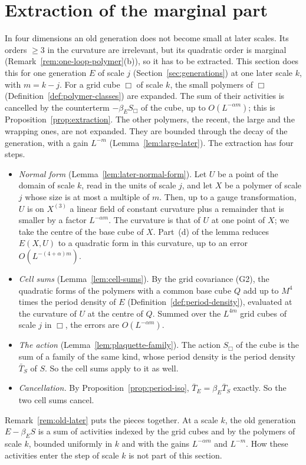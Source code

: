 \section{Extraction of the marginal part}\label{sec:extraction}

In four dimensions an old generation does not become small at later scales. Its orders $\ge3$ in the curvature are irrelevant, but its quadratic order is marginal (Remark~\ref{rem:one-loop-polymer}(b)), so it has to be extracted. This section does this for one generation $E$ of scale $j$ (Section~\ref{sec:generations}) at one later scale $k$, with $m=k-j$. For a grid cube $\Box$ of scale $k$, the small polymers of $\Box$ (Definition~\ref{def:polymer-classes}) are expanded. The sum of their activities is cancelled by the counterterm $-\beta_ES_\Box$ of the cube, up to $O(L^{-\alpha m})$; this is Proposition~\ref{prop:extraction}. The other polymers, the recent, the large and the wrapping ones, are not expanded. They are bounded through the decay of the generation, with a gain $L^{-m}$ (Lemma~\ref{lem:large-later}). The extraction has four steps.
\begin{itemize}
\item \emph{Normal form} (Lemma~\ref{lem:later-normal-form}). Let $U$ be a point of the domain of scale $k$, read in the units of scale $j$, and let $X$ be a polymer of scale $j$ whose size is at most a multiple of $m$. Then, up to a gauge transformation, $U$ is on $X^{(3)}$ a linear field of constant curvature plus a remainder that is smaller by a factor $L^{-\alpha m}$. The curvature is that of $U$ at one point of $X$; we take the centre of the base cube of $X$. Part~(d) of the lemma reduces $E(X,U)$ to a quadratic form in this curvature, up to an error $O(L^{-(4+\alpha)m})$.
\item \emph{Cell sums} (Lemma~\ref{lem:cell-sums}). By the grid covariance (G2), the quadratic forms of the polymers with a common base cube $Q$ add up to $M^4$ times the period density of $E$ (Definition~\ref{def:period-density}), evaluated at the curvature of $U$ at the centre of $Q$. Summed over the $L^{4m}$ grid cubes of scale $j$ in $\Box$, the errors are $O(L^{-\alpha m})$.
\item \emph{The action} (Lemma~\ref{lem:plaquette-family}). The action $S_\Box$ of the cube is the sum of a family of the same kind, whose period density is the period density $\bar T_S$ of $S$. So the cell sums apply to it as well.
\item \emph{Cancellation.} By Proposition~\ref{prop:period-iso}, $\bar T_E=\beta_E\bar T_S$ exactly. So the two cell sums cancel.
\end{itemize}
Remark~\ref{rem:old-later} puts the pieces together. At a scale $k$, the old generation $E-\beta_ES$ is a sum of activities indexed by the grid cubes and by the polymers of scale $k$, bounded uniformly in $k$ and with the gains $L^{-\alpha m}$ and $L^{-m}$. How these activities enter the step of scale $k$ is not part of this section.

